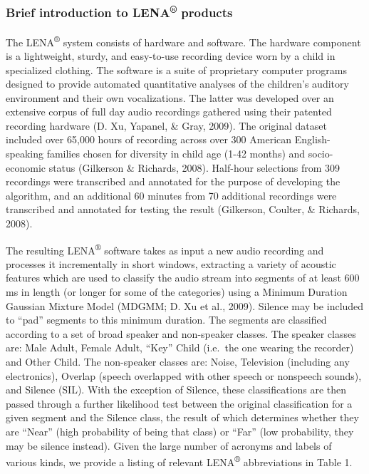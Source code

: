 \documentclass[english,table,man,floatsintext]{apa6}
\begin{document}
\subsubsection{\texorpdfstring{Brief introduction to
LENA\textsuperscript{®}
products}{Brief introduction to LENA® products}}\label{brief-introduction-to-lena-products}

The LENA\textsuperscript{®} system consists of hardware and software.
The hardware component is a lightweight, sturdy, and easy-to-use
recording device worn by a child in specialized clothing. The software
is a suite of proprietary computer programs designed to provide
automated quantitative analyses of the children's auditory environment
and their own vocalizations. The latter was developed over an extensive
corpus of full day audio recordings gathered using their patented
recording hardware (D. Xu, Yapanel, \& Gray, 2009). The original dataset
included over 65,000 hours of recording across over 300 American
English-speaking families chosen for diversity in child age (1-42
months) and socio-economic status (Gilkerson \& Richards, 2008).
Half-hour selections from 309 recordings were transcribed and annotated
for the purpose of developing the algorithm, and an additional 60
minutes from 70 additional recordings were transcribed and annotated for
testing the result (Gilkerson, Coulter, \& Richards, 2008).

The resulting LENA\textsuperscript{®} software takes as input a new
audio recording and processes it incrementally in short windows,
extracting a variety of acoustic features which are used to classify the
audio stream into segments of at least 600 ms in length (or longer for
some of the categories) using a Minimum Duration Gaussian Mixture Model
(MDGMM; D. Xu et al., 2009). Silence may be included to \enquote{pad}
segments to this minimum duration. The segments are classified according
to a set of broad speaker and non-speaker classes. The speaker classes
are: Male Adult, Female Adult, \enquote{Key} Child (i.e.~the one wearing
the recorder) and Other Child. The non-speaker classes are: Noise,
Television (including any electronics), Overlap (speech overlapped with
other speech or nonspeech sounds), and Silence (SIL). With the exception
of Silence, these classifications are then passed through a further
likelihood test between the original classification for a given segment
and the Silence class, the result of which determines whether they are
\enquote{Near} (high probability of being that class) or \enquote{Far}
(low probability, they may be silence instead). Given the large number
of acronyms and labels of various kinds, we provide a listing of
relevant LENA\textsuperscript{®} abbreviations in Table 1.
\end{document}

